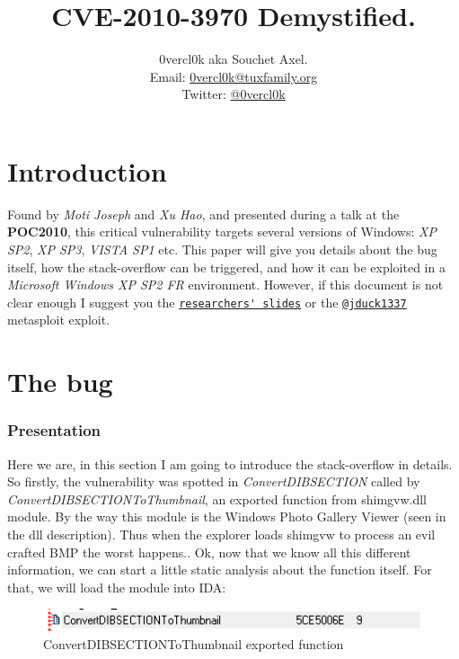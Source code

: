 \documentclass[12pt, titlepage]{article}
\begin{document}
\title{CVE-2010-3970 Demystified.}
\author{0vercl0k aka Souchet Axel.\\Email: \href{mailto:0vercl0k@tuxfamily.org}{0vercl0k@tuxfamily.org}\\ Twitter: \href{https://twitter.com/0vercl0k}{@0vercl0k}}
\date{}
\maketitle
\clearpage
\tableofcontents
\clearpage


\part{Introduction}
Found by \emph{Moti Joseph} and \emph{Xu Hao}, and presented during a talk at the \textbf{POC2010}, this critical vulnerability targets several versions of Windows: \emph{XP SP2}, \emph{XP SP3}, \emph{VISTA SP1} etc. This paper will give you details about the bug itself, how the stack-overflow can be triggered, and how it can be exploited in a \emph{Microsoft Windows XP SP2 FR} environment. However, if this document is not clear enough I suggest you the \href{http://www.exploit-db.com/download pdf/15899}{\nolinkurl{researchers' slides}} or the \href{https://twitter.com/jduck1337}{\nolinkurl{@jduck1337}} metasploit exploit.
\clearpage

\part{The bug}
\section{Presentation}
Here we are, in this section I am going to introduce the stack-overflow in details. So firstly, the vulnerability was spotted in \emph{ConvertDIBSECTION} called by \emph{ConvertDIBSECTIONToThumbnail}, an exported function from shimgvw.dll module. By the way this module is the Windows Photo Gallery Viewer (seen in the dll description). Thus when the explorer loads shimgvw to process an evil crafted BMP the worst happens..
Ok, now that we know all this different information, we can start a little static analysis about the function itself. For that, we will load the module into IDA:
\begin{figure}[h]
    \includegraphics[width=450pt]{pics/idaexportedaddr.png}
    \caption{ConvertDIBSECTIONToThumbnail exported function}
    \label{ConvertDIBSECTIONToThumbnail exported function}
\end{figure}
\end{document}

